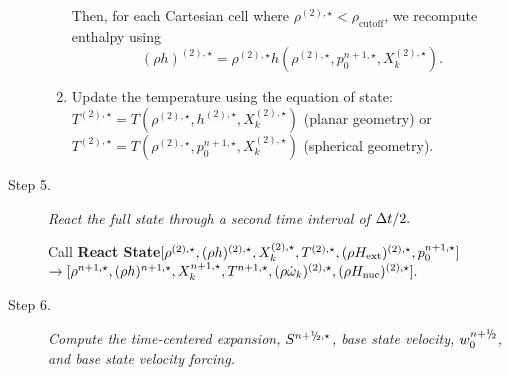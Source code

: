 \begin{description}
\begin{enumerate}
\begin{enumerate}
\end{enumerate}

Then, for each Cartesian cell where $\rho^{(2),\star} < \rho_\mathrm{cutoff}$,
we recompute enthalpy using
\begin{equation}
(\rho h)^{(2),\star} = \rho^{(2),\star}h\left(\rho^{(2),\star},p_0^{n+1,\star},X_k^{(2),\star}\right).
\end{equation}

\item Update the temperature using the equation of state:
$T^{(2),\star} = 
  T(\rho^{(2),\star}, h^{(2),\star}, X_k^{(2),\star})$ (planar geometry) or
$T^{(2),\star} = 
  T(\rho^{(2),\star}, p_0^{n+1,\star}, X_k^{(2),\star})$ (spherical geometry).
\end{enumerate}

\item[Step 5.] {\em React the full state through a second time interval of $\Delta t / 2.$}

Call {\bf React State}$[ \rho^{(2),\star},(\rho h)^{(2),\star}, X_k^{(2),\star}, T^{(2),\star}, 
(\rho{H_{\rm ext}})^{(2),\star}, p_0^{n+1,\star}]$\\
\phantom{ }\hfill$\rightarrow [ \rho^{n+1,\star},(\rho h)^{n+1,\star}, X_k^{n+1,\star}, T^{n+1,\star}, (\rho \dot{\omega}_k)^{(2),\star}, (\rho {H_{\rm nuc}})^{(2),\star} ].$

\item[Step 6.] {\em Compute the time-centered expansion, $S^{\nph,\star}$, base state
velocity, $w_0^{\nph}$, and base state velocity forcing.}

\begin{enumerate}
\renewcommand{\theenumi}{{\bf \Alph{enumi}}}


\end{enumerate}
\end{description}
